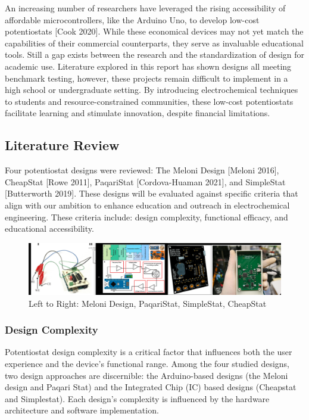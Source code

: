 \documentclass{article}
\begin{document}
An increasing number of researchers have leveraged the rising accessibility of affordable microcontrollers, like the Arduino Uno, to develop low-cost potentiostats [Cook 2020]. While these economical devices may not yet match the capabilities of their commercial counterparts, they serve as invaluable educational tools. Still a gap exists between the research and the standardization of design for academic use. Literature explored in this report has shown designs all meeting benchmark testing, however, these projects remain difficult to implement in a high school or undergraduate setting. By introducing electrochemical techniques to students and resource-constrained communities, these low-cost potentiostats facilitate learning and stimulate innovation, despite financial limitations.


\subsection*{Literature Review}
Four potentiostat designs were reviewed: The Meloni Design [Meloni 2016], CheapStat [Rowe 2011], PaqariStat [Cordova-Huaman 2021], and SimpleStat [Butterworth 2019]. These designs will be evaluated against specific criteria that align with our ambition to enhance education and outreach in electrochemical engineering. These criteria include: design complexity, functional efficacy, and educational accessibility.
\begin{figure}[H]
\centering
\includegraphics[width=1\linewidth]{review.png}
\caption{Left to Right: Meloni Design, PaqariStat, SimpleStat, CheapStat}
\end{figure}
\subsubsection*{Design Complexity}
Potentiostat design complexity is a critical factor that influences both the user experience and the device's functional range. Among the four studied designs, two design approaches are discernible: the Arduino-based designs (the Meloni design and Paqari Stat) and the Integrated Chip (IC) based designs (Cheapstat and Simplestat). Each design's complexity is influenced by the hardware architecture and software implementation.
\end{document}
